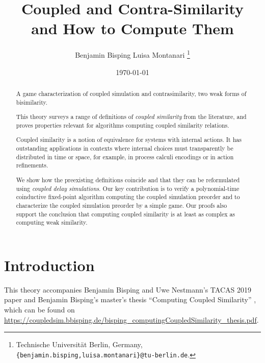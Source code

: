 \documentclass[10pt,a4paper]{article}
\title{ \textbf{Coupled and Contra-Similarity} \\ \Large and How to Compute Them }
\author{ Benjamin Bisping \qquad Luisa Montanari%
  \footnote{Technische Universit\"at Berlin, Germany,
    \texttt{\{benjamin.bisping,luisa.montanari\}@tu-berlin.de}.} }
\date{\today}
\begin{document}
\maketitle

\begin{abstract}
\noindent
A game characterization of coupled simulation and contrasimilarity, two weak forms of bisimilarity.

This theory surveys a range of definitions of \emph{coupled similarity} from the literature,
and proves properties relevant for algorithms computing coupled similarity relations.

Coupled similarity is a notion of equivalence for systems with internal actions.
It has outstanding applications in contexts where internal choices must transparently be
distributed in time or space, for example, in process calculi encodings or in action refinements.

We show how the preexisting definitions coincide and that they can be reformulated using
\emph{coupled delay simulations}. Our key contribution is to verify a polynomial-time coinductive
fixed-point algorithm computing the coupled simulation preorder and to characterize the
coupled simulation preorder by a simple game. Our proofs also support the conclusion that
computing coupled similarity is at least as complex as computing weak similarity.
\end{abstract}

\tableofcontents

\section{Introduction}

This theory accompanies Benjamin Bisping and Uwe Nestmann's TACAS 2019 paper \cite{bn2019coupledsimTacas}
and Benjamin Bisping's master's thesis ``Computing Coupled Similarity'' \cite{bisping2018coupledsim},
which can be found on \url{https://coupledsim.bbisping.de/bisping_computingCoupledSimilarity_thesis.pdf}.



{}


\end{document}
